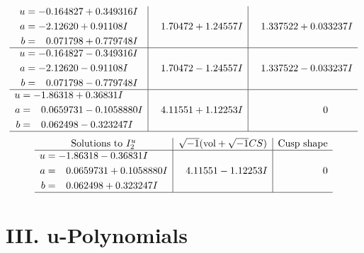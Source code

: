 \documentclass[1p]{elsarticle_modified}
\theoremstyle{definition}
\newcommand{\I}{\sqrt{-1}}
\begin{document}
$$\begin{array}{c|c|c}
\begin{aligned}
u &= -0.164827 + 0.349316 I \\
a &= -2.12620 + 0.91108 I \\
b &= \phantom{-}0.071798 + 0.779748 I\end{aligned}
 & \phantom{-}1.70472 + 1.24557 I & \phantom{-}1.337522 + 0.033237 I \\ \hline\begin{aligned}
u &= -0.164827 - 0.349316 I \\
a &= -2.12620 - 0.91108 I \\
b &= \phantom{-}0.071798 - 0.779748 I\end{aligned}
 & \phantom{-}1.70472 - 1.24557 I & \phantom{-}1.337522 - 0.033237 I \\ \hline\begin{aligned}
u &= -1.86318 + 0.36831 I \\
a &= \phantom{-}0.0659731 - 0.1058880 I \\
b &= \phantom{-}0.062498 - 0.323247 I\end{aligned}
 & \phantom{-}4.11551 + 1.12253 I & \phantom{-0.000000 } 0\\
 \hline 
 \end{array}$$\newpage$$\begin{array}{c|c|c}  
\text{Solutions to }I^u_{2}& \I (\text{vol} + \sqrt{-1}CS) & \text{Cusp shape}\\
 \hline 
\begin{aligned}
u &= -1.86318 - 0.36831 I \\
a &= \phantom{-}0.0659731 + 0.1058880 I \\
b &= \phantom{-}0.062498 + 0.323247 I\end{aligned}
 & \phantom{-}4.11551 - 1.12253 I & \phantom{-0.000000 } 0\\
 \hline 
 \end{array}$$\newpage
\newpage\renewcommand{\arraystretch}{1}
\centering \section*{ III. u-Polynomials}
\end{document}
